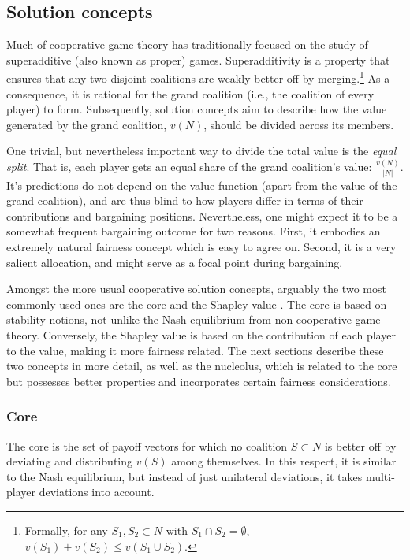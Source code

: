 \subsection{Solution concepts}

Much of cooperative game theory has traditionally focused on the study of superadditive (also known as proper) games. Superadditivity is a property that ensures that any two disjoint coalitions are weakly better off by merging.\footnote{Formally, for any $S_1, S_2 \subset N$ with $S_1 \cap S_2 = \emptyset$, $v(S_1) + v(S_2) \leq v(S_1 \cup S_2)$.} As a consequence, it is rational for the grand coalition (i.e., the coalition of every player) to form. Subsequently, solution concepts aim to describe how the value generated by the grand coalition, $v(N)$, should be divided across its members.

One trivial, but nevertheless important way to divide the total value is the \emph{equal split}. That is, each player gets an equal share of the grand coalition's value: $\frac{v(N)}{|N|}$. It's predictions do not depend on the value function (apart from the value of the grand coalition), and are thus blind to how players differ in terms of their contributions and bargaining positions. Nevertheless, one might expect it to be a somewhat frequent bargaining outcome for two reasons. First, it embodies an extremely natural fairness concept which is easy to agree on. Second, it is a very salient allocation, and might serve as a focal point during bargaining.

Amongst the more usual cooperative solution concepts, arguably the two most commonly used ones are the core \parencite{gillies1959solutions} and the Shapley value \parencite{shapley1953value}. The core is based on stability notions, not unlike the Nash-equilibrium from non-cooperative game theory. Conversely, the Shapley value is based on the contribution of each player to the value, making it more fairness related. The next sections describe these two concepts in more detail, as well as the nucleolus, which is related to the core but possesses better properties and incorporates certain fairness considerations.

\subsubsection{Core} \label{stability_statement}

The core is the set of payoff vectors for which no coalition $S \subset N$ is better off by deviating and distributing $v(S)$ among themselves. In this respect, it is similar to the Nash equilibrium, but instead of just unilateral deviations, it takes multi-player deviations into account.

